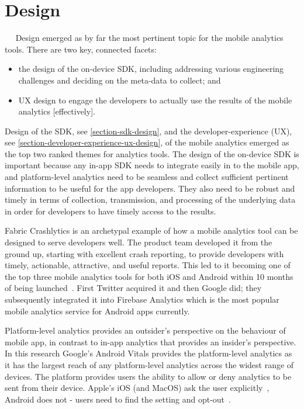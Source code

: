 \section{Design}~\label{section-design}~\label{tata-chapter-section-design}
Design emerged as by far the most pertinent topic for the mobile analytics tools. There are two key, connected facets: 


\begin{itemize}
\item the design of the on-device SDK, including addressing various engineering challenges and deciding on the meta-data to collect; and 
\item UX design to engage the developers to actually use the results of the mobile analytics [effectively].
\end{itemize}

Design of the SDK, see \ref{section-sdk-design}, and the developer-experience (UX), see \ref{section-developer-experience-ux-design}, of the mobile analytics emerged as the top two ranked themes for analytics tools. The design of the on-device SDK is important because any in-app SDK needs to integrate easily in to the mobile app, and platform-level analytics need to be seamless and collect sufficient pertinent information to be useful for the app developers. They also need to be robust and timely in terms of collection, transmission, and processing of the underlying data in order for developers to have timely access to the results. 

Fabric Crashlytics is an archetypal example of how a mobile analytics tool can be designed to serve developers well. The product team developed it from the ground up, starting with excellent crash reporting, to provide developers with timely, actionable, attractive, and useful reports. This led to it becoming one of the top three mobile analytics tools for both iOS and Android within 10 months of being launched~\citep{___answersblog_2015_may_crashlytics-no1-in-performance}. %
First Twitter acquired it and then Google did; they subsequently integrated it into Firebase Analytics which is the most popular mobile analytics service for Android apps currently.

Platform-level analytics provides an outsider's perspective on the behaviour of mobile app, in contrast to in-app analytics that provides an insider's perspective. In this research Google's Android Vitals provides the platform-level analytics as it has the largest reach of any platform-level analytics across the widest range of devices. The platform provides users the ability to allow or deny analytics to be sent from their device. Apple's iOS (and MacOS) ask the user explicitly~\citep{apple_ios_share_diagnostics}, Android does not - users need to find the setting and opt-out~\citep{google_play_share_usage_and_diagnostics_info_with_google}. %

